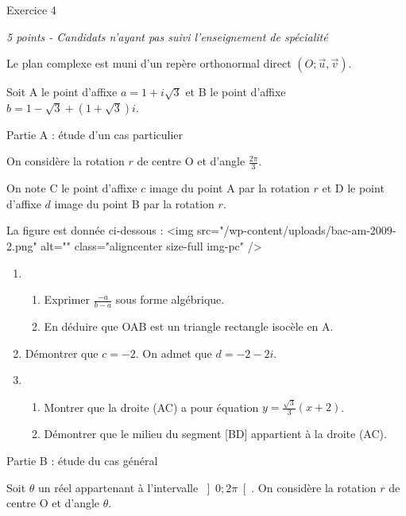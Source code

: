 
%
\begin{h2}Exercice 4\end{h2}
\textit{5 points - Candidats n'ayant pas suivi l'enseignement de spécialité }
\par
Le plan complexe est muni d'un repère orthonormal direct $\left(O; \vec{u}, \vec{v}\right)$.
\par
Soit A le point d'affixe $a=1+i\sqrt{3}$ et B le point d'affixe $b=1-\sqrt{3}+\left(1+\sqrt{3}\right)i$.
\begin{h3}Partie A : étude d'un cas particulier\end{h3}
On considère la rotation $r$ de centre O et d'angle $\frac{2\pi }{3}$.
\par
On note C le point d'affixe $c$ image du point A par la rotation $r$ et D le point d'affixe $d$ image du point B par la rotation $r$.
\par
La figure est donnée ci-dessous :
<img src="/wp-content/uploads/bac-am-2009-2.png" alt="" class="aligncenter size-full  img-pc" />
\begin{enumerate}
     \item
     \begin{enumerate}[label=\alph*.]
          \item
          Exprimer $\frac{- a}{b-a}$ sous forme algébrique.
          \item
          En déduire que OAB est un triangle rectangle isocèle en A.
     \end{enumerate}
     \item
     Démontrer que $c=-2$. On admet que $d=-2-2i$.
     \item
     \begin{enumerate}[label=\alph*.]
          \item
          Montrer que la droite (AC) a pour équation $y=\frac{\sqrt{3}}{3}\left(x+ 2\right)$.
          \item
          Démontrer que le milieu du segment [BD] appartient à la droite (AC).
     \end{enumerate}
\end{enumerate}
\begin{h3}Partie B : étude du cas général\end{h3}
Soit $\theta $ un réel appartenant à l'intervalle $\left]0; 2\pi \right[$. On considère la rotation $r$ de centre O et d'angle $\theta $.
